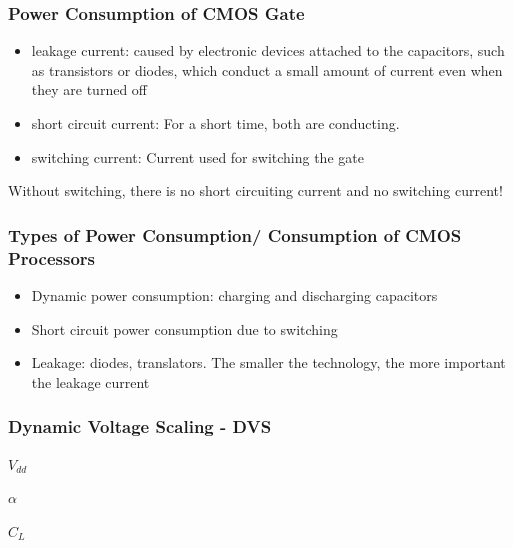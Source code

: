 \subsubsection{Power Consumption of CMOS Gate}
\begin{itemize}[noitemsep]
\item leakage current: caused by electronic devices attached to the capacitors, such as transistors or diodes, which conduct a small amount of current even when they are turned off
\item short circuit current: For a short time, both are conducting.
\item switching current: Current used for switching the gate
\end{itemize}

\begin{tnote}
Without switching, there is no short circuiting current and no switching current!
\end{tnote}

\subsubsection{Types of Power Consumption/ Consumption of CMOS Processors}
\begin{itemize}[noitemsep]
\item Dynamic power consumption: charging and discharging capacitors
\item Short circuit power consumption due to switching
\item Leakage: diodes, translators. The smaller the technology, the more important the leakage current
\end{itemize}



\subsubsection{Dynamic Voltage Scaling - DVS}

\begin{definition} 
$V_{dd}$
\end{definition}

\begin{definition} 
$\alpha$
\end{definition}

\begin{definition} 
$C_L$
\end{definition}


